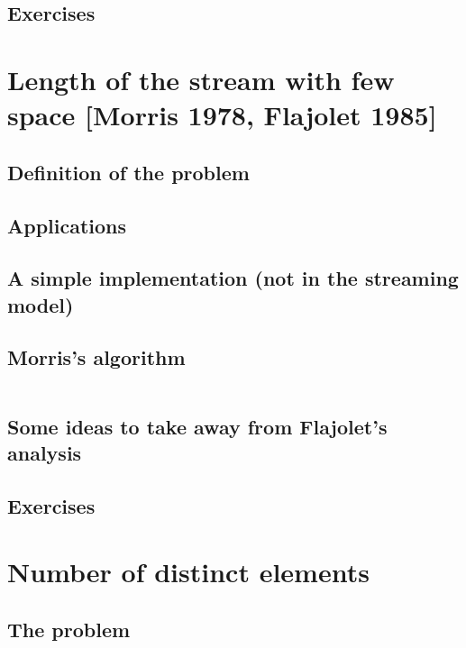 \documentclass[12pt]{article}
\begin{document}
\subsection{Exercises}



\section{Length of the stream with few space {\small [Morris 1978, Flajolet 1985]}}

\subsection{Definition of the problem}

\subsection{Applications}

\subsection{A simple implementation (not in the streaming model)}

\subsection{Morris's algorithm} $\,$

\subsection{Some ideas to take away from Flajolet's analysis}

\subsection{Exercises}


\section{Number of distinct elements}

\subsection{The problem}
\end{document}
